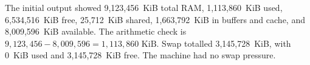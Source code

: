 The initial output showed 9,123,456~KiB total RAM, 1,113,860~KiB used,
6,534,516~KiB free, 25,712~KiB shared, 1,663,792~KiB in buffers and cache,
and 8,009,596~KiB available. The arithmetic check is
$9{,}123{,}456 - 8{,}009{,}596 = 1{,}113{,}860\text{ KiB}$.
Swap totalled 3,145,728~KiB, with 0~KiB used and 3,145,728~KiB free. The
machine had no swap pressure.
